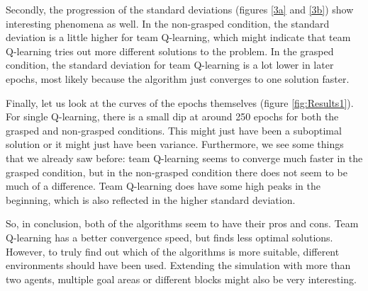 Secondly, the progression of the standard deviations (figures \ref{3a} and \ref{3b}) show interesting phenomena as well. In the non-grasped condition, the standard deviation is a little higher for team Q-learning, which might indicate that team Q-learning tries out more different solutions to the problem. In the grasped condition, the standard deviation for team Q-learning is a lot lower in later epochs, most likely because the algorithm just converges to one solution faster.

Finally, let us look at the curves of the epochs themselves (figure \ref{fig:Results1}). For single Q-learning, there is a small dip at around 250 epochs for both the grasped and non-grasped conditions. This might just have been a suboptimal solution or it might just have been variance. Furthermore, we see some things that we already saw before: team Q-learning seems to converge much faster in the grasped condition, but in the non-grasped condition there does not seem to be much of a difference. Team Q-learning does have some high peaks in the beginning, which is also reflected in the higher standard deviation.

So, in conclusion, both of the algorithms seem to have their pros and cons. Team Q-learning has a better convergence speed, but finds less optimal solutions. However, to truly find out which of the algorithms is more suitable, different environments should have been used. Extending the simulation with more than two agents, multiple goal areas or different blocks might also be very interesting.